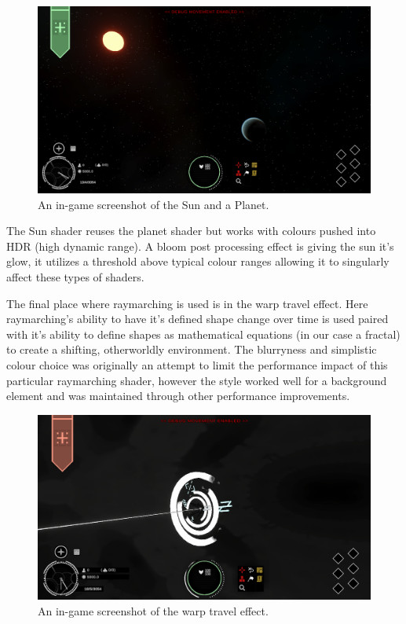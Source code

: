 \documentclass{report}
\begin{document}
\begin{figure}[H]
	\centering
    \includegraphics[width=.9\textwidth]{environmentExample1.png}
    \caption{An in-game screenshot of the Sun and a Planet.}
\end{figure}

The Sun shader reuses the planet shader but works with colours pushed into HDR (high dynamic range). A bloom post processing effect is giving the sun it's glow, it utilizes a threshold above typical colour ranges allowing it to singularly affect these types of shaders.

The final place where raymarching is used is in the warp travel effect. Here raymarching's ability to have it's defined shape change over time is used paired with it's ability to define shapes as mathematical equations (in our case a fractal) to create a shifting, otherworldly environment. The blurryness and simplistic colour choice was originally an attempt to limit the performance impact of this particular raymarching shader, however the style worked well for a background element and was maintained through other performance improvements.

\begin{figure}[H]
	\centering
    \includegraphics[width=.9\textwidth]{environmentExample2.png}
    \caption{An in-game screenshot of the warp travel effect.}
\end{figure}
\end{document}
